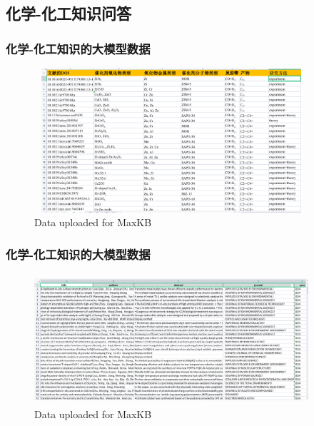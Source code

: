\subsection{化学-化工知识问答}
\begin{frame}
	\frametitle{化学-化工知识的大模型数据}	
\begin{figure}[h!]
\centering
\includegraphics[height=2.10in,width=4.00in,viewport=0 0 1149 636,clip]{Figures/MaxKB_Info-1.png}
\caption{\tiny\textrm{Data uploaded for MaxKB}}%
\label{Fig:MaxKB_Data-1}
\end{figure}
\end{frame}

\begin{frame}
	\frametitle{化学-化工知识的大模型数据}	
\begin{figure}[h!]
\centering
\includegraphics[height=1.90in,width=4.00in,viewport=0 0 1456 647,clip]{Figures/MaxKB_Info-2.png}
\caption{\tiny\textrm{Data uploaded for MaxKB}}%
\label{Fig:MaxKB_Data-2}
\end{figure}
\end{frame}

